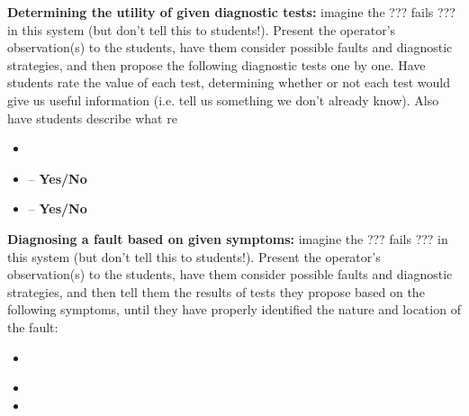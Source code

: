 \vskip 10pt


\noindent
{\bf Determining the utility of given diagnostic tests:} imagine the ??? fails ??? in this system (but don't tell this to students!).  Present the operator's observation(s) to the students, have them consider possible faults and diagnostic strategies, and then propose the following diagnostic tests one by one.  Have students rate the value of each test, determining whether or not each test would give us useful information (i.e. tell us something we don't already know).  Also have students describe what re

\begin{itemize}
\item{} {\it }
\item{}  -- {\bf Yes/No}
\item{}  -- {\bf Yes/No}
\end{itemize}


\vskip 10pt


\noindent
{\bf Diagnosing a fault based on given symptoms:} imagine the ??? fails ??? in this system (but don't tell this to students!).  Present the operator's observation(s) to the students, have them consider possible faults and diagnostic strategies, and then tell them the results of tests they propose based on the following symptoms, until they have properly identified the nature and location of the fault:

\begin{itemize}
\item{} {\it }
\item{} 
\item{} 
\end{itemize}





